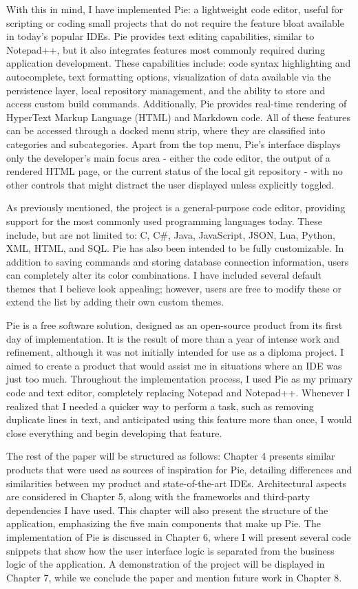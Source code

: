 With this in mind, I have implemented Pie: a lightweight code editor, useful for scripting or coding small projects that do not require the feature bloat available in today's popular IDEs. Pie provides text editing capabilities, similar to Notepad++, but it also integrates features most commonly required during application development. These capabilities include: code syntax highlighting and autocomplete, text formatting options, visualization of data available via the persistence layer, local repository management, and the ability to store and access custom build commands. Additionally, Pie provides real-time rendering of HyperText Markup Language (HTML) and Markdown code. All of these features can be accessed through a docked menu strip, where they are classified into categories and subcategories. Apart from the top menu, Pie's interface displays only the developer's main focus area - either the code editor, the output of a rendered HTML page, or the current status of the local git repository - with no other controls that might distract the user displayed unless explicitly toggled. 

As previously mentioned, the project is a general-purpose code editor, providing support for the most commonly used programming languages today. These include, but are not limited to: C, C\#, Java, JavaScript, JSON, Lua, Python, XML, HTML, and SQL. Pie has also been intended to be fully customizable. In addition to saving commands and storing database connection information, users can completely alter its color combinations. I have included several default themes that I believe look appealing; however, users are free to modify these or extend the list by adding their own custom themes.

Pie is a free software solution, designed as an open-source product from its first day of implementation. It is the result of more than a year of intense work and refinement, although it was not initially intended for use as a diploma project. I aimed to create a product that would assist me in situations where an IDE was just too much. Throughout the implementation process, I used Pie as my primary code and text editor, completely replacing Notepad and Notepad++. Whenever I realized that I needed a quicker way to perform a task, such as removing duplicate lines in text, and anticipated using this feature more than once, I would close everything and begin developing that feature.

The rest of the paper will be structured as follows: Chapter 4 presents similar products that were used as sources of inspiration for Pie, detailing differences and similarities between my product and state-of-the-art IDEs. Architectural aspects are considered in Chapter 5, along with the frameworks and third-party dependencies I have used. This chapter will also present the structure of the application, emphasizing the five main components that make up Pie. The implementation of Pie is discussed in Chapter 6, where I will present several code snippets that show how the user interface logic is separated from the business logic of the application. A demonstration of the project will be displayed in Chapter 7, while we conclude the paper and mention future work in Chapter 8.